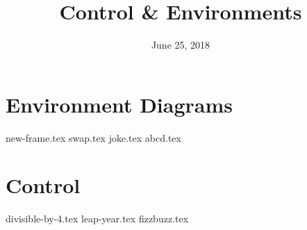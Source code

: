 \documentclass{exam}
\title{Control \& Environments}
\date{June 25, 2018}
\begin{document}
\maketitle
\section{Environment Diagrams}
\begin{questions}
{new-frame.tex}
{swap.tex}
\newpage
{joke.tex}
{abcd.tex}
\end{questions}

\section{Control}
\begin{questions}
{divisible-by-4.tex}
{leap-year.tex}
{fizzbuzz.tex}
\end{questions}
\end{document}
